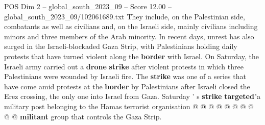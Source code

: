 \begin{textsample}{POS Dim 2 – global\_south\_2023\_09 – Score 12.00 – global\_south\_2023\_09/102061689.txt}
They include, on the Palestinian side, combatants as well as civilians and, on the Israeli side, mainly civilians including minors and three members of the Arab minority.
In recent days, unrest has also surged in the Israeli-blockaded Gaza Strip, with Palestinians holding daily protests that have turned violent along the \textbf{border} with Israel.
On Saturday, the Israeli army carried out a \textbf{drone} \textbf{strike} after violent protests in which three Palestinians were wounded by Israeli fire.
The \textbf{strike} was one of a series that have come amid protests at the \textbf{border} by Palestinians after Israeli closed the Erez crossing, the only one into Israel from Gaza.
Saturday ' s \textbf{strike} \textbf{targeted}"a military post belonging to the Hamas terrorist organisation @ @ @ @ @ @ @ @ @ @ \textbf{militant} group that controls the Gaza Strip.

\end{textsample}
